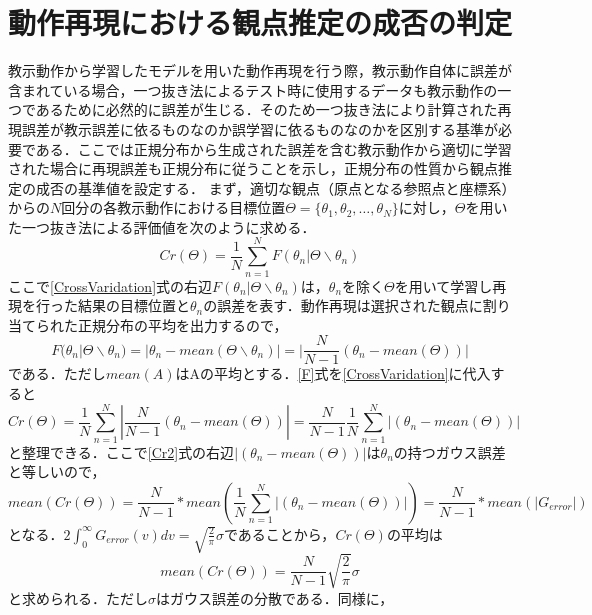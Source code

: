 \chapter{動作再現における観点推定の成否の判定}\label{appendix2}

教示動作から学習したモデルを用いた動作再現を行う際，教示動作自体に誤差が含まれている場合，一つ抜き法によるテスト時に使用するデータも教示動作の一つであるために必然的に誤差が生じる．そのため一つ抜き法により計算された再現誤差が教示誤差に依るものなのか誤学習に依るものなのかを区別する基準が必要である．ここでは正規分布から生成された誤差を含む教示動作から適切に学習された場合に再現誤差も正規分布に従うことを示し，正規分布の性質から観点推定の成否の基準値を設定する．
まず，適切な観点（原点となる参照点と座標系）からの$N$回分の各教示動作における目標位置$Θ=\{θ_{1} , θ_{2} , \ldots , θ_{N}\}$に対し，$Θ$を用いた一つ抜き法による評価値を次のように求める．
	\begin{equation}
		\label{CrossVaridation}
		Cr(Θ) = \frac{1}{N} \sum_{n=1}^{N} F(θ_{n} | Θ \backslash θ_{n})
	\end{equation}
ここで\ref{CrossVaridation}式の右辺$F(θ_{n} | Θ \backslash θ_{n})$は，$θ_{n}$を除く$Θ$を用いて学習し再現を行った結果の目標位置と$θ_{n}$の誤差を表す．動作再現は選択された観点に割り当てられた正規分布の平均を出力するので，
	\begin{equation}
		\label{F}
		F(θ_{n} | Θ \backslash θ_{n}) = |θ_{n} - mean(Θ \backslash θ_{n})| = |\frac{N}{N-1}(θ_{n} - mean(Θ))|
	\end{equation}
である．ただし$mean(A)$はAの平均とする．\ref{F}式を\ref{CrossVaridation}に代入すると
	\begin{equation}
		\label{Cr2}
		Cr(Θ) = \frac{1}{N} \sum_{n=1}^{N}  |\frac{N}{N-1}(θ_{n} - mean(Θ))|
		 = \frac{N}{N-1}\frac{1}{N}  \sum_{n=1}^{N}  |(θ_{n} - mean(Θ))| 
	\end{equation}
と整理できる．ここで\ref{Cr2}式の右辺$|(θ_{n} - mean(Θ))|$は$θ_{n}$の持つガウス誤差と等しいので，
	\begin{equation}
		\label{Cr3}
		mean(Cr(Θ)) = \frac{N}{N-1} * mean(\frac{1}{N}  \sum_{n=1}^{N}  |(θ_{n} - mean(Θ))| )
		 = \frac{N}{N-1} * mean(|G_{error}|)
	\end{equation}
となる．$2\int_{0}^{\infty}G_{error}(v)dv = \sqrt{\frac{2}{\pi}}σ$であることから，$Cr(Θ)$の平均は
	\begin{equation}
		\label{Cr4}
		mean(Cr(Θ)) = \frac{N}{N-1}\sqrt{\frac{2}{\pi}}σ
	\end{equation}
と求められる．ただし$σ$はガウス誤差の分散である．同様に，
